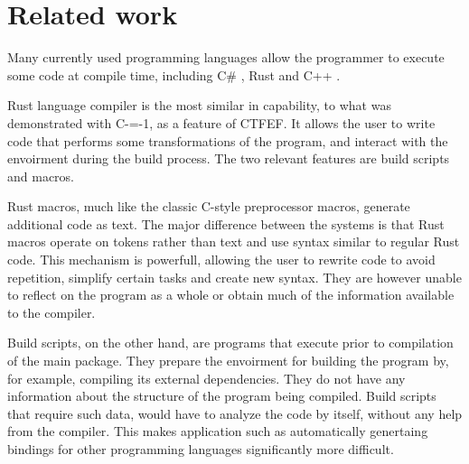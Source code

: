 \section{Related work}
\label{related-work}

Many currently used programming languages allow the programmer to execute some code at compile time, including C\# \cite{csharp:source_generators,roslyn}, Rust \cite{rust, klabnik2019rust} and C++ \cite{ISO:cpp20}.

Rust language compiler is the most similar in capability, to what was demonstrated with C-=-1, as a feature of CTFEF.
It allows the user to write code that performs some transformations of the program, and interact with the envoirment during the build process.
The two relevant features are build scripts and macros.

Rust macros, much like the classic C-style preprocessor macros, generate additional code as text.
The major difference between the systems is that Rust macros operate on tokens rather than text and use syntax similar to regular Rust code.
This mechanism is powerfull, allowing the user to rewrite code to avoid repetition, simplify certain tasks and create new syntax.
They are however unable to reflect on the program as a whole or obtain much of the information available to the compiler.

Build scripts, on the other hand, are programs that execute prior to compilation of the main package.
They prepare the envoirment for building the program by, for example, compiling its external dependencies.
They do not have any information about the structure of the program being compiled.
Build scripts that require such data, would have to analyze the code by itself, without any help from the compiler.
This makes application such as automatically genertaing bindings for other programming languages significantly more difficult.
